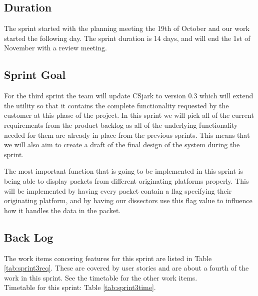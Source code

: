 \subsection{Duration}

The sprint started with the planning meeting the 19th of October and our work started the following day. The sprint duration is 14 days, and will end the 1st of November with a review meeting. 


\subsection{Sprint Goal}
For the third sprint the team will update CSjark to version 0.3 which will extend the utility so that it contains the complete functionality requested by the customer at this phase of the project. In this sprint we will pick all of the current requirements from the product backlog as all of the underlying functionality needed for them are already in place from the previous sprints. This means that we will also aim to create a draft of the final design of the system during the sprint.

The most important function that is going to be implemented in this sprint is being able to display packets from different originating platforms properly. This will be implemented by having every packet contain a flag specifying their originating platform, and by having our dissectors use this flag value to influence how it handles the data in the packet.

\subsection{Back Log}
The work items concering features for this sprint are listed in Table \ref{tab:sprint3req}. These are covered by user stories and are about a fourth of the work in this sprint. See the timetable for the other work items.\\
Timetable for this sprint: Table \ref{tab:sprint3time}.\\


